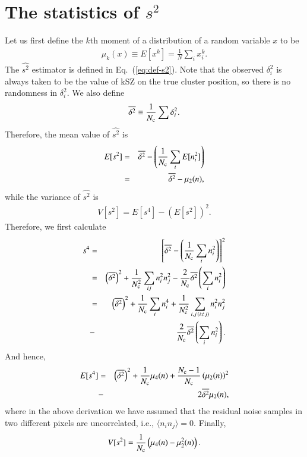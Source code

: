 \documentclass[traditabstract, longauth]{aa}
\newcommand{\1}{\'\i }
\begin{document}
\section{The statistics of {\boldmath $s^{2}$}}
\label{sec:AppA}
Let us first define
the $k$th moment of a distribution of a random variable $x$ to be
\begin{eqnarray}
\mu_{k}(x) \equiv E[x^{k}] =\frac{1}{N} \sum_{i} x^{k}_{i} .\label{eq:k-moment}
\end{eqnarray}
The $\widehat{s^{2}}$ estimator is defined in Eq.~(\ref{eq:def-s2}). Note that
the observed $\delta^{2}_{i}$ is always taken to be the value of kSZ on the
true cluster position, so there is no randomness in $\delta^{2}_{i}$. We also
define
\begin{eqnarray}
\overline{\delta^{2}} \equiv \frac{1}{N_{\rm c}}\sum \delta^{2}_{i}.
\end{eqnarray}
Therefore, the mean value of $\widehat{s^{2}}$ is
\begin{eqnarray}
E[s^{2}] &=& \overline{\delta^{2}}- \left(\frac{1}{N_{\rm c}}\sum_{i}E[n_{i}^{2}] \right) \nonumber \\
&=& \overline{\delta^{2}} -\mu_{2}(n), \label{eq:Es2}
\end{eqnarray}
while the variance of $\widehat{s^{2}}$ is
\begin{eqnarray}
V[s^{2}]=E[s^{4}]-\left(E[s^{2}]\right)^{2}.
\end{eqnarray}
Therefore, we first calculate
\begin{eqnarray}
s^{4} &=& \left[ \overline{\delta^{2}}- \left(\frac{1}{N_{\rm c}}\sum_{i}n_{i}^{2} \right)
 \right]^{2} \nonumber \\
&=& \left(\overline{\delta^{2}} \right)^{2}+\frac{1}{N^{2}_{\rm c}} \sum_{ij}n^{2}_{i}n^{2}_{j}-\frac{2}{N_{\rm c}}\overline{\delta^{2}} \left(\sum_{i} n^{2}_{i} \right) \nonumber \\
&=& \left(\overline{\delta^{2}} \right)^{2}+\frac{1}{N_{\rm c}} \sum_{i}n^{4}_{i} +\frac{1}{N^{2}_{\rm c}}\sum_{i,j \,(i \neq j)}n^{2}_{i}n^{2}_{j} \nonumber \\
&-& \frac{2}{N_{\rm c}}\overline{\delta^{2}} \left(\sum_{i} n^{2}_{i} \right).
\end{eqnarray}
And hence,
\begin{eqnarray}
E[s^{4}] &=& \left(\overline{\delta^{2}} \right)^{2}+\frac{1}{N_{\rm c}} \mu_{4}(n) +\frac{N_{\rm c}-1}{N_{\rm c}}\left(\mu_{2}(n) \right)^{2}  \nonumber \\
&-& 2\overline{\delta^{2}} \mu_{2}(n),
\end{eqnarray}
where in the above derivation we have assumed that the residual noise samples
in two different pixels are uncorrelated, i.e., $\langle n_{i}n_{j} \rangle=0$.
Finally,
\begin{eqnarray}
V[s^{2}]=\frac{1}{N_{\rm c}}\left(\mu_{4}(n)-\mu^{2}_{2}(n) \right). \label{eq:Vs2}
\end{eqnarray}
\end{document}
